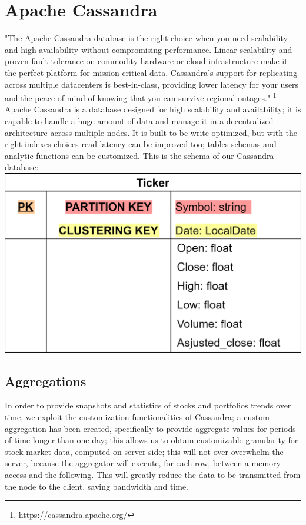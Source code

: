 \section{Apache Cassandra}
"The Apache Cassandra database is the right choice when you need scalability and high 
availability without compromising performance. Linear scalability and proven fault-tolerance 
on commodity hardware or cloud infrastructure make it the perfect platform for mission-critical 
data. Cassandra's support for replicating across multiple datacenters is best-in-class, 
providing lower latency for your users and the peace of mind of knowing that you can survive
regional outages." \footnote{https://cassandra.apache.org/}\\
Apache Cassandra is a database designed for high scalability and availability; it is 
capable to handle a huge amount of data and manage it in a decentralized architecture
across multiple nodes. It is built to be write optimized, but with the right indexes choices
read latency can be improved too; tables schemas and analytic functions can be customized.
This is the schema of our Cassandra database:\\
\includegraphics[scale=0.2]{img/cassandraDB_scheme.png}\\

\subsection{Aggregations}
In order to provide snapshots and statistics of stocks and portfolios trends over time,
we exploit the customization functionalities of Cassandra; a custom aggregation has been 
created, specifically to provide aggregate values for periods of time longer than one day; this allows us to obtain customizable granularity for stock market data,
computed on server side; this will not over overwhelm the server, because the aggregator will
execute, for each row, between a memory access and the following. This will greatly reduce
the data to be transmitted from the node to the client, saving bandwidth and time.  \\


